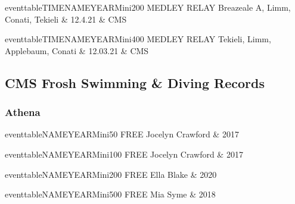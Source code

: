 \vspace{0.3cm}

\begin{minipage}[t]{0.44\textwidth}
\centering
eventtableTIMENAMEYEARMini{200 MEDLEY RELAY}{
Breazeale A, Limm, Conati, Tekieli & 12.4.21 & CMS \\
}
\end{minipage}\hfill
\begin{minipage}[t]{0.44\textwidth}
\centering

\end{minipage}

\vspace{0.3cm}

\begin{minipage}[t]{0.44\textwidth}
\centering
eventtableTIMENAMEYEARMini{400 MEDLEY RELAY}{
Tekieli, Limm, Applebaum, Conati & 12.03.21 & CMS \\
}
\end{minipage}\hfill
\begin{minipage}[t]{0.44\textwidth}
\centering

\end{minipage}

\vspace{0.3cm}

\newpage

\subsection{CMS Frosh Swimming & Diving Records}
\subsubsection{Athena}

\begin{minipage}[t]{0.44\textwidth}
\centering
eventtableNAMEYEARMini{50 FREE}{
Jocelyn Crawford & 2017 \\
}
\end{minipage}\hfill
\begin{minipage}[t]{0.44\textwidth}
\centering
eventtableNAMEYEARMini{100 FREE}{
Jocelyn Crawford & 2017 \\
}
\end{minipage}

\vspace{0.3cm}

\begin{minipage}[t]{0.44\textwidth}
\centering
eventtableNAMEYEARMini{200 FREE}{
Ella Blake & 2020 \\
}
\end{minipage}\hfill
\begin{minipage}[t]{0.44\textwidth}
\centering
eventtableNAMEYEARMini{500 FREE}{
Mia Syme & 2018 \\
}
\end{minipage}

